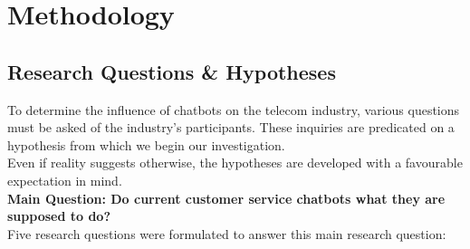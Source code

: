 \mainmatter
\pagestyle{headings}

\chapter{Methodology}
\label{ch:methodology}
\section{Research Questions \& Hypotheses}
To determine the influence of chatbots on the telecom industry, various questions must be asked of the industry's participants. These inquiries are predicated on a hypothesis from which we begin our investigation.\\
\break
Even if reality suggests otherwise, the hypotheses are developed with a favourable expectation in mind.\\
\break
\textbf{Main Question: Do current customer service chatbots what they are supposed to do?}\\
\break 
Five research questions were formulated to answer this main research question:

